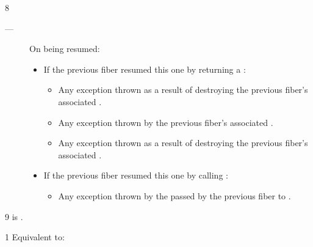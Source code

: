 8 \except
\begin{description}
    \item[---] On being resumed:
    \begin{itemize}
        \item If the previous fiber resumed this one by returning a \fiber:
            \begin{itemize}
                \item Any exception thrown as a result of destroying the
                      previous fiber's associated .
                \item Any exception thrown by the previous fiber's
                      associated .
                \item Any exception thrown as a result of destroying the
                      previous fiber's associated .
            \end{itemize}
        \item If the previous fiber resumed this one by calling \anyresumewith:
        \begin{itemize}
            \item Any exception thrown by the  passed by the previous
                  fiber to \anyresumewith.
        \end{itemize}
    \end{itemize}
\end{description}

9 \postcond
\emptyfn is \true.




1 \effects
Equivalent to:\\


